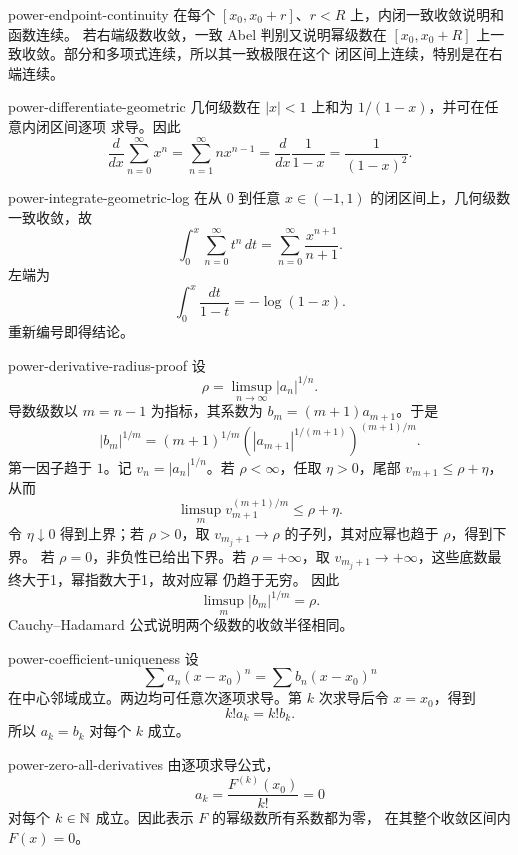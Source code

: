 \begin{solution}{power-endpoint-continuity}
在每个 \([x_0,x_0+r]\)、\(r<R\) 上，内闭一致收敛说明和函数连续。
若右端级数收敛，一致 Abel 判别又说明幂级数在
\([x_0,x_0+R]\) 上一致收敛。部分和多项式连续，所以其一致极限在这个
闭区间上连续，特别是在右端连续。
\end{solution}

\begin{solution}{power-differentiate-geometric}
几何级数在 \(|x|<1\) 上和为 \(1/(1-x)\)，并可在任意内闭区间逐项
求导。因此
\[
 \frac{d}{dx}\sum_{n=0}^\infty x^n
 =\sum_{n=1}^\infty nx^{n-1}
 =\frac{d}{dx}\frac1{1-x}
 =\frac1{(1-x)^2}.
\]
\end{solution}

\begin{solution}{power-integrate-geometric-log}
在从 \(0\) 到任意 \(x\in(-1,1)\) 的闭区间上，几何级数一致收敛，故
\[
 \int_0^x\sum_{n=0}^\infty t^n\,dt
 =\sum_{n=0}^\infty\frac{x^{n+1}}{n+1}.
\]
左端为
\[
 \int_0^x\frac{dt}{1-t}=-\log(1-x).
\]
重新编号即得结论。
\end{solution}

\begin{solution}{power-derivative-radius-proof}
设
\[
 \rho=\limsup_{n\to\infty}|a_n|^{1/n}.
\]
导数级数以 \(m=n-1\) 为指标，其系数为 \(b_m=(m+1)a_{m+1}\)。于是
\[
 |b_m|^{1/m}
 =(m+1)^{1/m}
 \left(|a_{m+1}|^{1/(m+1)}\right)^{(m+1)/m}.
\]
第一因子趋于 \(1\)。记 \(v_n=|a_n|^{1/n}\)。若 \(\rho<\infty\)，任取
\(\eta>0\)，尾部 \(v_{m+1}\le\rho+\eta\)，从而
\[
 \limsup_m v_{m+1}^{(m+1)/m}\le\rho+\eta.
\]
令 \(\eta\downarrow0\) 得到上界；若 \(\rho>0\)，取
\(v_{m_j+1}\to\rho\) 的子列，其对应幂也趋于 \(\rho\)，得到下界。
若 \(\rho=0\)，非负性已给出下界。若 \(\rho=+\infty\)，取
\(v_{m_j+1}\to+\infty\)，这些底数最终大于1，幂指数大于1，故对应幂
仍趋于无穷。
因此
\[
 \limsup_m|b_m|^{1/m}=\rho.
\]
Cauchy--Hadamard 公式说明两个级数的收敛半径相同。
\end{solution}

\begin{solution}{power-coefficient-uniqueness}
设
\[
 \sum a_n(x-x_0)^n=\sum b_n(x-x_0)^n
\]
在中心邻域成立。两边均可任意次逐项求导。第 \(k\) 次求导后令
\(x=x_0\)，得到
\[
 k!a_k=k!b_k.
\]
所以 \(a_k=b_k\) 对每个 \(k\) 成立。
\end{solution}

\begin{solution}{power-zero-all-derivatives}
由逐项求导公式，
\[
 a_k=\frac{F^{(k)}(x_0)}{k!}=0
\]
对每个 \(k\in\mathbb{N}\) 成立。因此表示 \(F\) 的幂级数所有系数都为零，
在其整个收敛区间内 \(F(x)=0\)。
\end{solution}

